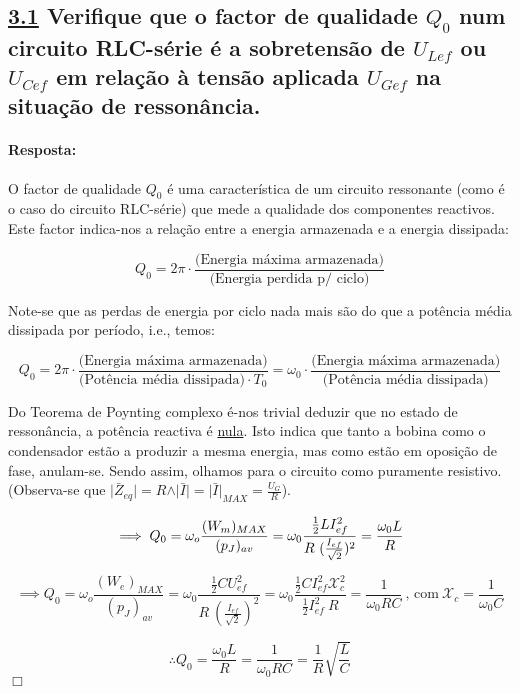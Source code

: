 \subsection*{\underline{3.1} Verifique que o factor de qualidade $Q_0$ num circuito RLC-série é a sobretensão de $U_{Lef}$ ou $U_{Cef}$ em relação à tensão aplicada $U_{Gef}$ na situação de ressonância.}
\paragraph{Resposta:}
O factor de qualidade $Q_0$  é uma característica de um circuito ressonante (como é o caso do circuito RLC-série) que mede a qualidade dos componentes reactivos. Este factor indica-nos a relação entre a energia armazenada e a energia dissipada:

$$ Q_0 = 2\pi \cdot \frac{\text{(Energia máxima armazenada)}}{\text{(Energia perdida p/ ciclo)}} $$

Note-se que as perdas de energia por ciclo nada mais são do que a potência média dissipada por período, i.e., temos:

$$ Q_0 = 2\pi \cdot \frac{\text{(Energia máxima armazenada)}}{\text{(Potência média dissipada)}\cdot T_0} = \omega_0 \cdot \frac{\text{(Energia máxima armazenada)}}{\text{(Potência média dissipada)}}$$

Do Teorema de Poynting complexo é-nos trivial deduzir que no estado de ressonância, a potência reactiva é \underline{nula}. Isto indica que tanto a bobina como o condensador estão a produzir a mesma energia, mas como estão em oposição de fase, anulam-se. Sendo assim, olhamos para o circuito como puramente resistivo. (Observa-se que $\vert \bar{Z}_{eq}\vert = R \land \vert \bar{I}\vert = \vert\bar{I}\vert_{MAX} = \frac{U_{G}}{R}$).

$$ 
\implies Q_0 = \omega_o \frac{(W_m)_{MAX}}{(p_J)_{av}} = \omega_0 \frac{\frac{1}{2}LI_{ef}^2}{R\ (\frac{I_{ef}}{\sqrt{2}})^2} = \frac{\omega_0 L}{R}\\ 
$$

$$
\implies Q_0 = \omega_o \frac{(W_e)_{MAX}}{(p_J)_{av}} = \omega_0 \frac{\frac{1}{2}C U_{ef}^2}{R\ (\frac{I_{ef}}{\sqrt{2}})^2} = \omega_0 \frac{\frac{1}{2} C I_{ef}^2 \mathcal{X}_c^2}{\frac{1}{2}I_{ef}^2\ R} = \frac{1}{\omega_0 RC}\ \text{, com}\ \mathcal{X}_c = \frac{1}{\omega_0 C}
$$

$$
\therefore Q_0 = \frac{\omega_0 L}{R} = \frac{1}{\omega_0 RC} = \frac{1}{R}\sqrt{\frac{L}{C}}
$$
\hfill \ensuremath{\Box}

